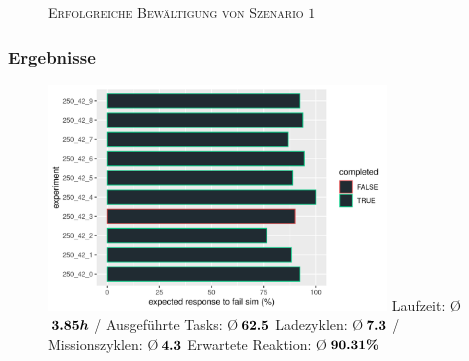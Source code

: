 \documentclass{beamer}
\begin{document}
\begin{frame}
\begin{figure}[H]
\begin{subfigure}[b]{0.24\textwidth}
    \end{subfigure}
  \caption*{\textsc{Erfolgreiche Bewältigung von Szenario $1$}}
  \end{figure}
\end{frame}


\begin{frame}
  \frametitle{Ergebnisse}
  \begin{figure}[H]
    \centering
    \includegraphics[width=0.8\textwidth]{img/expected_res.png}\linebreak\newline
    \centering
    Laufzeit: \O $\thinspace \boldsymbol{3.85 h}$ / Ausgeführte Tasks: \O $\thinspace \boldsymbol{62.5}$\linebreak
    \centering
    Ladezyklen: \O $\thinspace \boldsymbol{7.3}$ / Missionszyklen: \O $\thinspace \boldsymbol{4.3}$\linebreak
    \centering
    Erwartete Reaktion: \O $\thinspace \boldsymbol{90.31 \%}$
  \end{figure}
\end{frame}
\end{document}
